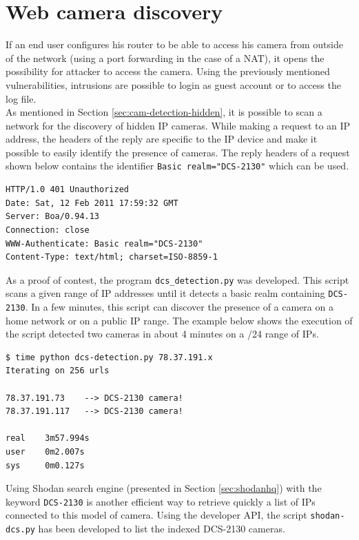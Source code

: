 \section{Web camera discovery}
\label{sec:dcs-web-access}

If an end user configures his router to be able to access his camera from outside of the network (using a port forwarding in the case of a NAT), it opens the possibility for attacker to access the camera.
Using the previously mentioned vulnerabilities, intrusions are possible to login as guest account or to access the log file.\\

As mentioned in Section \ref{sec:cam-detection-hidden}, it is possible to scan a network for the discovery of hidden IP cameras.
While making a request to an IP address, the headers of the reply are specific to the IP device and make it possible to easily identify the presence of cameras.
The reply headers of a request shown below contains the identifier \texttt{Basic realm="DCS-2130"} which can be used.

\begin{verbatim}
HTTP/1.0 401 Unauthorized
Date: Sat, 12 Feb 2011 17:59:32 GMT
Server: Boa/0.94.13
Connection: close
WWW-Authenticate: Basic realm="DCS-2130"
Content-Type: text/html; charset=ISO-8859-1
\end{verbatim}

As a proof of contest, the program \texttt{dcs\_detection.py} was developed.
This script scans a given range of IP addresses until it detects a basic realm containing \texttt{DCS-2130}.
In a few minutes, this script can discover the presence of a camera on a home network or on a public IP range.
The example below shows the execution of the script detected two cameras in about 4 minutes on a /24 range of IPs.\\

\begin{verbatim}
$ time python dcs-detection.py 78.37.191.x
Iterating on 256 urls

78.37.191.73    --> DCS-2130 camera!
78.37.191.117   --> DCS-2130 camera!

real    3m57.994s
user    0m2.007s
sys     0m0.127s
\end{verbatim}

Using Shodan search engine (presented in Section \ref{sec:shodanhq}) with the keyword \texttt{DCS-2130} is another efficient way to retrieve quickly a list of IPs connected to this model of camera.
Using the developer API, the script \texttt{shodan-dcs.py} has been developed to list the indexed DCS-2130 cameras.\\

